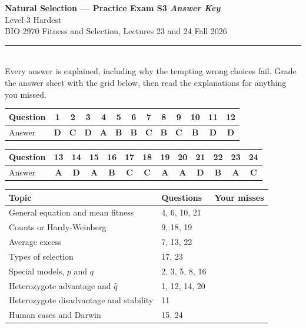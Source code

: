 \documentclass[11pt]{article}
\begin{document}
\begin{center}
  {\LARGE\bfseries Natural Selection --- Practice Exam S3 \textit{Answer Key}}\\[5pt]
  {\large Level 3 \quad\textbullet\quad Hardest}\\[6pt]
  BIO 2970 \quad\textbullet\quad Fitness and Selection, Lectures 23 and 24 \quad\textbullet\quad Fall 2026\\[3pt]
  \rule{\textwidth}{0.8pt}\\[3pt]
  {\small Every answer is explained, including why the tempting wrong choices fail. Grade the answer sheet with the grid below, then read the explanations for anything you missed.}
\end{center}
\vspace{0.4em}

\begin{center}\small\setlength{\tabcolsep}{6.2pt}\begin{tabular}{lcccccccccccc}
\toprule
Question & 1 & 2 & 3 & 4 & 5 & 6 & 7 & 8 & 9 & 10 & 11 & 12 \\
\midrule
Answer & \textbf{D} & \textbf{C} & \textbf{D} & \textbf{A} & \textbf{B} & \textbf{B} & \textbf{C} & \textbf{B} & \textbf{C} & \textbf{B} & \textbf{D} & \textbf{D} \\
\bottomrule\end{tabular}\end{center}
\begin{center}\small\setlength{\tabcolsep}{6.2pt}\begin{tabular}{lcccccccccccc}
\toprule
Question & 13 & 14 & 15 & 16 & 17 & 18 & 19 & 20 & 21 & 22 & 23 & 24 \\
\midrule
Answer & \textbf{A} & \textbf{D} & \textbf{A} & \textbf{B} & \textbf{C} & \textbf{C} & \textbf{A} & \textbf{A} & \textbf{D} & \textbf{B} & \textbf{A} & \textbf{C} \\
\bottomrule\end{tabular}\end{center}
\begin{center}\small\begin{tabular}{lll}\toprule Topic & Questions & Your misses\\\midrule
General equation and mean fitness & 4, 6, 10, 21 & \\
Counts or Hardy-Weinberg & 9, 18, 19 & \\
Average excess & 7, 13, 22 & \\
Types of selection & 17, 23 & \\
Special models, \(p\) and \(q\) & 2, 3, 5, 8, 16 & \\
Heterozygote advantage and \(\hat{q}\) & 1, 12, 14, 20 & \\
Heterozygote disadvantage and stability & 11 & \\
Human cases and Darwin & 15, 24 & \\
\bottomrule\end{tabular}\end{center}
\end{document}
